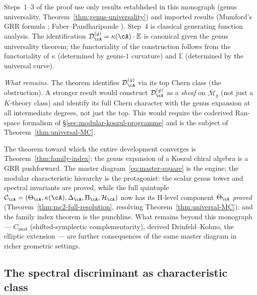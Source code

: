 \begin{remark}[Scope]\label{rem:family-index-scope}
Steps~1--3 of the proof use only results established
in this monograph (genus universality,
Theorem~\ref{thm:genus-universality}) and imported results
(Mumford's GRR formula \cite{Mumford83}; Faber--Pandharipande
\cite{FP00}).  Step~4 is classical generating function analysis.
The identification $\mathcal{D}_{\cA}^{(g)} =
\kappa(\cA) \cdot \mathbb{E}$ is canonical given the genus
universality theorem; the functoriality of the construction
follows from the functoriality of $\kappa$ (determined by
genus-$1$ curvature) and $\mathbb{E}$ (determined by the
universal curve).

\emph{What remains.}
The theorem identifies $\mathcal{D}_{\cA}^{(g)}$ via its top Chern
class (the obstruction).  A stronger result would construct
$\mathcal{D}_{\cA}^{(g)}$ as a \emph{sheaf} on
$\overline{\mathcal{M}}_g$ (not just a $K$-theory class) and
identify its full Chern character with the genus expansion at all
intermediate degrees, not just the top.  This would require the
coderived Ran-space formalism of
\S\ref{sec:modular-koszul-programme} and is the subject of
Theorem~\ref{thm:universal-MC}.
\end{remark}

\begin{remark}
\label{rem:grr-horizon}
The theorem toward which the entire development converges is
Theorem~\ref{thm:family-index}: the genus expansion of a
Koszul chiral algebra is a GRR pushforward.
The master diagram~\eqref{eq:master-square} is the engine;
the modular characteristic hierarchy is the protagonist:
the scalar genus tower and spectral invariants are proved,
while the full quintuple
$\mathcal{C}_{\cA} = (\Theta_{\cA}, \kappa(\cA), \Delta_{\cA},
\Pi_{\cA}, \mathcal{H}_{\cA})$ now has its H-level component
$\Theta_{\cA}$ \emph{proved}
\textup{(}Theorem~\textup{\ref{thm:mc2-full-resolution}},
resolving
Theorem~\textup{\ref{thm:universal-MC}}\textup{)};
and the family index theorem is the punchline.
What remains beyond this monograph ---
$C_{\mathrm{mod}}$ (shifted-symplectic complementarity),
derived Drinfeld--Kohno, the elliptic extension ---
are further consequences of the same master diagram in richer
geometric settings.
\end{remark}

\subsection{The spectral discriminant as characteristic class}

